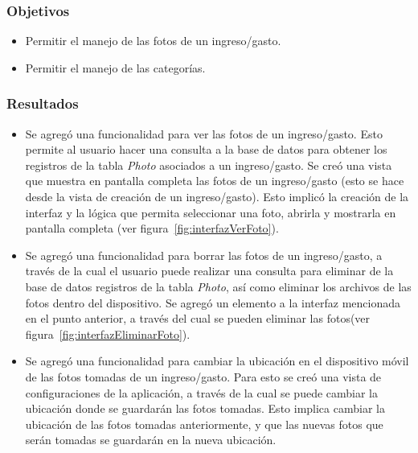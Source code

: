 \subsubsection{Objetivos}
\begin{itemize}
\item Permitir el manejo de las fotos de un ingreso/gasto.
\item Permitir el manejo de las categorías.
\end{itemize}

\subsubsection{Resultados}
\begin{itemize}
\item Se agregó una funcionalidad para ver las fotos de un ingreso/gasto. Esto permite al usuario hacer una consulta a la base de datos para obtener los registros de la tabla \textit{Photo} asociados a un ingreso/gasto. Se creó una vista que muestra en pantalla completa las fotos de un ingreso/gasto (esto se hace desde la vista de creación de un ingreso/gasto). Esto implicó la creación de la interfaz y la lógica que permita seleccionar una foto, abrirla y mostrarla en pantalla completa (ver figura~\ref{fig:interfazVerFoto}).
\item Se agregó una funcionalidad para borrar las fotos de un ingreso/gasto, a través de la cual el usuario puede realizar una consulta para eliminar de la base de datos registros de la tabla \textit{Photo}, así como eliminar los archivos de las fotos dentro del dispositivo. Se agregó un elemento a la interfaz mencionada en el punto anterior, a través del cual se pueden eliminar las fotos(ver figura~\ref{fig:interfazEliminarFoto}).
\item Se agregó una funcionalidad para cambiar la ubicación en el dispositivo móvil de las fotos tomadas de un ingreso/gasto. Para esto se creó una vista de configuraciones de la aplicación, a través de la cual se puede cambiar la ubicación donde se guardarán las fotos tomadas. Esto implica cambiar la ubicación de las fotos tomadas anteriormente, y que las nuevas fotos que serán tomadas se guardarán en la nueva ubicación.


\end{itemize}

